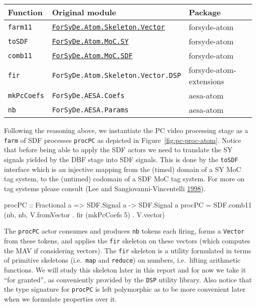 \documentclass[
  a4paper,
]{article}
\newenvironment{Shaded}{}{}
\newcommand{\DataTypeTok}[1]{\textcolor[rgb]{0.56,0.13,0.00}{#1}}
\newcommand{\DecValTok}[1]{\textcolor[rgb]{0.25,0.63,0.44}{#1}}
\newcommand{\FunctionTok}[1]{\textcolor[rgb]{0.02,0.16,0.49}{#1}}
\newcommand{\NormalTok}[1]{#1}
\newcommand{\OtherTok}[1]{\textcolor[rgb]{0.00,0.44,0.13}{#1}}
\begin{document}
\begin{longtable}[]{@{}lll@{}}
\toprule
Function & Original module & Package\tabularnewline
\midrule
\endhead
\texttt{farm11} &
\href{https://forsyde.github.io/forsyde-atom/api/ForSyDe-Atom-Skeleton-Vector.html}{\texttt{ForSyDe.Atom.Skeleton.Vector}}
& forsyde-atom\tabularnewline
\texttt{toSDF} &
\href{https://forsyde.github.io/forsyde-atom/api/ForSyDe-Atom-MoC-SY.html}{\texttt{ForSyDe.Atom.MoC.SY}}
& forsyde-atom\tabularnewline
\texttt{comb11} &
\href{https://forsyde.github.io/forsyde-atom/api/ForSyDe-Atom-MoC-SDF.html}{\texttt{ForSyDe.Atom.MoC.SDF}}
& forsyde-atom\tabularnewline
\texttt{fir} & \texttt{ForSyDe.Atom.Skeleton.Vector.DSP} &
forsyde-atom-extensions\tabularnewline
\texttt{mkPcCoefs} & \texttt{ForSyDe.AESA.Coefs} &
aesa-atom\tabularnewline
\texttt{nb} & \texttt{ForSyDe.AESA.Params} & aesa-atom\tabularnewline
\bottomrule
\end{longtable}

Following the reasoning above, we instantiate the PC video processing
stage as a \texttt{farm} of SDF processes \texttt{procPC} as depicted in
Figure~\ref{fig:pc-proc-atom}. Notice that before being able to apply
the SDF actors we need to translate the SY signals yielded by the DBF
stage into SDF signals. This is done by the \texttt{toSDF} interface
which is an injective mapping from the (timed) domain of a SY MoC tag
system, to the (untimed) codomain of a SDF MoC tag system. For more on
tag systems please consult (Lee and Sangiovanni-Vincentelli
\protect\hyperlink{ref-lee98}{1998}).

\begin{Shaded}
\begin{Highlighting}[numbers=left,,firstnumber=235,]
\OtherTok{procPC ::} \DataTypeTok{Fractional}\NormalTok{ a }\OtherTok{=>} \DataTypeTok{SDF.Signal}\NormalTok{ a }\OtherTok{->} \DataTypeTok{SDF.Signal}\NormalTok{ a }
\NormalTok{procPC }\FunctionTok{=}\NormalTok{ SDF.comb11 (nb, nb, V.fromVector }\FunctionTok{.}\NormalTok{ fir (mkPcCoefs }\DecValTok{5}\NormalTok{) }\FunctionTok{.}\NormalTok{ V.vector)}
\end{Highlighting}
\end{Shaded}

The \texttt{procPC} actor consumes and produces \texttt{nb} tokens each
firing, forms a \texttt{Vector} from these tokens, and applies the
\texttt{fir} skeleton on these vectors (which computes the MAV if
considering vectors). The \texttt{fir} skeleton is a utility formulated
in terms of primitive skeletons (i.e.~\texttt{map} and \texttt{reduce})
on numbers, i.e.~lifting arithmetic functions. We will study this
skeleton later in this report and for now we take it ``for granted'', as
conveniently provided by the \texttt{DSP} utility library. Also notice
that the type signature for \texttt{procPC} is left polymorphic as to be
more convenient later when we formulate properties over it.
\end{document}
